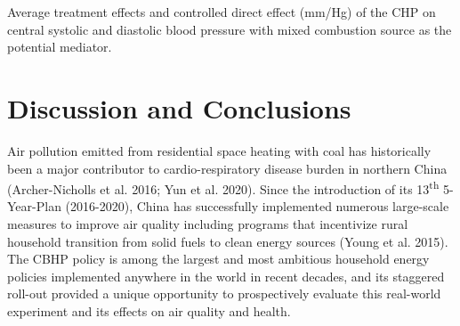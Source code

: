 \documentclass[
  letterpaper,
  DIV=11,
  numbers=noendperiod]{scrartcl}
\makeatletter
\renewenvironment{table}%
   {\renewcommand\familydefault\sfdefault
    \@float{table}}
   {\end@float}
\makeatother
\begin{document}
\begin{table}

\caption{\label{tbl-med-source}Average treatment effects and controlled
direct effect (mm/Hg) of the CHP on central systolic and diastolic blood
pressure with mixed combustion source as the potential mediator.}


\end{table}%

\section{Discussion and Conclusions}\label{discussion-and-conclusions}

Air pollution emitted from residential space heating with coal has
historically been a major contributor to cardio-respiratory disease
burden in northern China (Archer-Nicholls et al. 2016; Yun et al. 2020).
Since the introduction of its 13\textsuperscript{th} 5-Year-Plan
(2016-2020), China has successfully implemented numerous large-scale
measures to improve air quality including programs that incentivize
rural household transition from solid fuels to clean energy sources
(Young et al. 2015). The CBHP policy is among the largest and most
ambitious household energy policies implemented anywhere in the world in
recent decades, and its staggered roll-out provided a unique opportunity
to prospectively evaluate this real-world experiment and its effects on
air quality and health.
\end{document}
